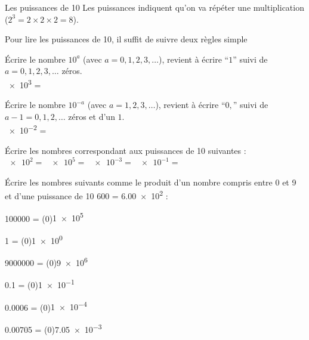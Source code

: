 \teteSndMeth
\vspace*{-36pt}


\vspace*{-10pt}

\begin{doc}{Les puissances de 10}
  Les puissances indiquent qu'on va répéter une multiplication ($2^3 = 2 \times 2 \times 2 = 8$).
  
  Pour lire les puissances de 10, il suffit de suivre deux règles simple
  \begin{importants}
    \pointCyan Écrire le nombre $10^a$ (avec $a = 0, 1, 2, 3, \ldots$), revient à écrire ``$1$'' suivi de $a = 0, 1, 2, 3, \ldots$ zéros. \\
    \exemple \num{e3} =

    \pointCyan Écrire le nombre $10^{-a}$ (avec $a = 1, 2, 3, \ldots$), revient à écrire ``$0,$'' suivi de $a - 1 = 0, 1, 2, \ldots$ zéros et d'un $1$. \\
    \exemple \num{e-2} =
  \end{importants}
\end{doc}


\numeroQuestion Écrire les nombres correspondant aux puissances de 10 suivantes : \\
$\num{e2}  =$  \qq{}
$\num{e5}  =$  \qq{}
$\num{e-3} =$  \qq{}
$\num{e-1} =$ 

\numeroQuestion Écrire les nombres suivants comme le produit d'un nombre compris entre 0 et 9 et d'une puissance de 10 \exemple \num{600} = \num{6,00e2} :
\pasCorrection{\vspace*{-4pt}}
\begin{listePoints}[2]
  \setlength\itemsep{-4pt}
  \item \num{100000}  = \texteTrou(0){\num{1e5}}
  \item \num{1}       = \texteTrou(0){\num{1e0}}
  \item \num{9000000} = \texteTrou(0){\num{9e6}}
  \item \num{0,1}     = \texteTrou(0){\num{1e-1}}
  \item \num{0,0006}  = \texteTrou(0){\num{1e-4}}
  \item \num{0,00705} = \texteTrou(0){\num{7,05e-3}}
\end{listePoints}


